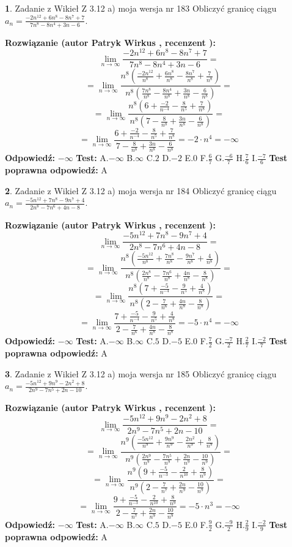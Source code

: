 \documentclass[12pt, a4paper]{article}
\theoremstyle{definition} %
\newtheorem{zad}{}
\newcommand{\zadStart}[1]{\begin{zad}#1\newline}
\newcommand{\zadStop}{\end{zad}}
\newcommand{\rozwStart}[2]{\noindent \textbf{Rozwiązanie (autor #1 , recenzent #2): }\newline}
\newcommand{\rozwStop}{\newline}
\newcommand{\odpStart}{\noindent \textbf{Odpowiedź:}\newline}
\newcommand{\odpStop}{\newline}
\newcommand{\testStart}{\noindent \textbf{Test:}\newline}
\newcommand{\testStop}{\newline}
\newcommand{\kluczStart}{\noindent \textbf{Test poprawna odpowiedź:}\newline}
\newcommand{\kluczStop}{\newline}
\begin{document}
\zadStart{Zadanie z Wikieł Z 3.12 a) moja wersja nr 183}
Obliczyć granicę ciągu $a_{n}=\frac{-2n^{12}+6n^{8}-8n^{7}+7}{7n^{8}-8n^{4}+3n-6}$.
\zadStop
\rozwStart{Patryk Wirkus}{}
$$\lim\limits_{n\to\infty}\frac{-2n^{12}+6n^{8}-8n^{7}+7}{7n^{8}-8n^{4}+3n-6}=$$
$$=\lim\limits_{n\to\infty}\frac{n^{8}\left(\frac{-2n^{12}}{n^{8}}+\frac{6n^{8}}{n^{8}}-\frac{8n^{7}}{n^{8}}+\frac{7}{n^{8}}\right)}{n^{8}\left(\frac{7n^{8}}{n^{8}}-\frac{8n^{4}}{n^{8}}+\frac{3n}{n^{8}}-\frac{6}{n^{8}}\right)}=$$
$$=\lim\limits_{n\to\infty}\frac{n^{8}\left(6+\frac{-2}{n^{-4}}-\frac{8}{n^{5}}+\frac{7}{n^{8}}\right)}
{n^{8}\left(7-\frac{8}{n^{8}}+\frac{3n}{n^{8}}-\frac{6}{n^{8}}\right)}=$$
$$=\lim\limits_{n\to\infty}\frac{6+\frac{-2}{n^{-4}}-\frac{8}{n^{5}}+\frac{7}{n^{8}}}{7-\frac{8}{n^{8}}+\frac{3n}{n^{8}}-\frac{6}{n^{8}}}=-2\cdot n^{4} = -\infty$$
\rozwStop
\odpStart
$-\infty$
\odpStop
\testStart
A.$-\infty$
B.$\infty$
C.$2$
D.$-2$
E.$0$
F.$\frac{6}{7}$
G.$\frac{-6}{7}$
H.$\frac{7}{6}$
I.$\frac{-7}{6}$
\testStop
\kluczStart
A
\kluczStop



\zadStart{Zadanie z Wikieł Z 3.12 a) moja wersja nr 184}
Obliczyć granicę ciągu $a_{n}=\frac{-5n^{12}+7n^{8}-9n^{7}+4}{2n^{8}-7n^{6}+4n-8}$.
\zadStop
\rozwStart{Patryk Wirkus}{}
$$\lim\limits_{n\to\infty}\frac{-5n^{12}+7n^{8}-9n^{7}+4}{2n^{8}-7n^{6}+4n-8}=$$
$$=\lim\limits_{n\to\infty}\frac{n^{8}\left(\frac{-5n^{12}}{n^{8}}+\frac{7n^{8}}{n^{8}}-\frac{9n^{7}}{n^{8}}+\frac{4}{n^{8}}\right)}{n^{8}\left(\frac{2n^{8}}{n^{8}}-\frac{7n^{6}}{n^{8}}+\frac{4n}{n^{8}}-\frac{8}{n^{8}}\right)}=$$
$$=\lim\limits_{n\to\infty}\frac{n^{8}\left(7+\frac{-5}{n^{-4}}-\frac{9}{n^{5}}+\frac{4}{n^{8}}\right)}
{n^{8}\left(2-\frac{7}{n^{6}}+\frac{4n}{n^{8}}-\frac{8}{n^{8}}\right)}=$$
$$=\lim\limits_{n\to\infty}\frac{7+\frac{-5}{n^{-4}}-\frac{9}{n^{5}}+\frac{4}{n^{8}}}{2-\frac{7}{n^{6}}+\frac{4n}{n^{8}}-\frac{8}{n^{8}}}=-5\cdot n^{4} = -\infty$$
\rozwStop
\odpStart
$-\infty$
\odpStop
\testStart
A.$-\infty$
B.$\infty$
C.$5$
D.$-5$
E.$0$
F.$\frac{7}{2}$
G.$\frac{-7}{2}$
H.$\frac{2}{7}$
I.$\frac{-2}{7}$
\testStop
\kluczStart
A
\kluczStop



\zadStart{Zadanie z Wikieł Z 3.12 a) moja wersja nr 185}
Obliczyć granicę ciągu $a_{n}=\frac{-5n^{12}+9n^{9}-2n^{2}+8}{2n^{9}-7n^{5}+2n-10}$.
\zadStop
\rozwStart{Patryk Wirkus}{}
$$\lim\limits_{n\to\infty}\frac{-5n^{12}+9n^{9}-2n^{2}+8}{2n^{9}-7n^{5}+2n-10}=$$
$$=\lim\limits_{n\to\infty}\frac{n^{9}\left(\frac{-5n^{12}}{n^{9}}+\frac{9n^{9}}{n^{9}}-\frac{2n^{2}}{n^{9}}+\frac{8}{n^{9}}\right)}{n^{9}\left(\frac{2n^{9}}{n^{9}}-\frac{7n^{5}}{n^{9}}+\frac{2n}{n^{9}}-\frac{10}{n^{9}}\right)}=$$
$$=\lim\limits_{n\to\infty}\frac{n^{9}\left(9+\frac{-5}{n^{-3}}-\frac{2}{n^{10}}+\frac{8}{n^{9}}\right)}
{n^{9}\left(2-\frac{7}{n^{7}}+\frac{2n}{n^{9}}-\frac{10}{n^{9}}\right)}=$$
$$=\lim\limits_{n\to\infty}\frac{9+\frac{-5}{n^{-3}}-\frac{2}{n^{10}}+\frac{8}{n^{9}}}{2-\frac{7}{n^{7}}+\frac{2n}{n^{9}}-\frac{10}{n^{9}}}=-5\cdot n^{3} = -\infty$$
\rozwStop
\odpStart
$-\infty$
\odpStop
\testStart
A.$-\infty$
B.$\infty$
C.$5$
D.$-5$
E.$0$
F.$\frac{9}{2}$
G.$\frac{-9}{2}$
H.$\frac{2}{9}$
I.$\frac{-2}{9}$
\testStop
\kluczStart
A
\kluczStop
\end{document}
